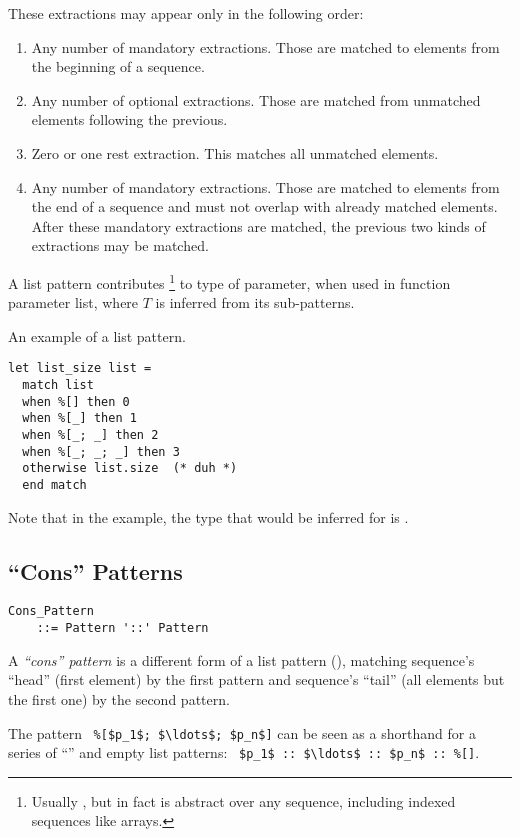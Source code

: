 These extractions may appear only in the following order:
\begin{enumerate}
  \item Any number of mandatory extractions. Those are matched to elements from the beginning of a sequence. 
  \item Any number of optional extractions. Those are matched from unmatched elements following the previous. 
  \item Zero or one rest extraction. This matches all unmatched elements. 
  \item Any number of mandatory extractions. Those are matched to elements from the end of a sequence and must not overlap with already matched elements. After these mandatory extractions are matched, the previous two kinds of extractions may be matched. 
\end{enumerate}

A list pattern contributes \footnote{Usually , but in fact is abstract over any sequence, including indexed sequences like arrays.} to type of parameter, when used in function parameter list, where $T$ is inferred from its sub-patterns. 

\example An example of a list pattern.
\begin{lstlisting}
let list_size list = 
  match list 
  when %[] then 0
  when %[_] then 1
  when %[_; _] then 2
  when %[_; _; _] then 3
  otherwise list.size  (* duh *)
  end match
\end{lstlisting}
Note that in the example, the type that would be inferred for  is . 





\subsection[“Cons” Patterns]{``Cons'' Patterns}
\label{sec:cons-patterns}

\grammar\begin{lstlisting}
Cons_Pattern 
    ::= Pattern '::' Pattern
\end{lstlisting}

A {\em ``cons'' pattern} is a different form of a list pattern (), matching sequence's ``head'' (first element) by the first pattern and sequence's ``tail'' (all elements but the first one) by the second pattern. 

The pattern ~\lstinline!%[$p_1$; $\ldots$; $p_n$]! can be seen as a shorthand for a series of ``\code{::}'' and empty list patterns: ~\lstinline!$p_1$ :: $\ldots$ :: $p_n$ :: %[]!. 

